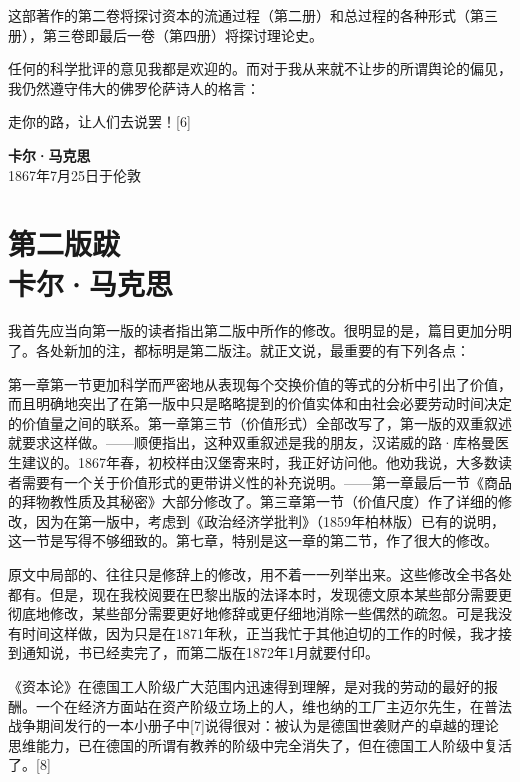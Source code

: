 \documentclass{ctexbook}
\begin{document}
这部著作的第二卷将探讨资本的流通过程（第二册）和总过程的各种形式（第三册），第三卷即最后一卷（第四册）将探讨理论史。

任何的科学批评的意见我都是欢迎的。而对于我从来就不让步的所谓舆论的偏见，我仍然遵守伟大的佛罗伦萨诗人的格言：

走你的路，让人们去说罢！[6]

\begin{flushright}
    \textbf{卡尔·马克思}\\
    \small{1867年7月25日于伦敦}
\end{flushright}



\chapter[卡尔·马克思\hspace{1em}第二版跋]{第二版跋\\{\small 卡尔·马克思}}

我首先应当向第一版的读者指出第二版中所作的修改。很明显的是，篇目更加分明了。各处新加的注，都标明是第二版注。就正文说，最重要的有下列各点：

第一章第一节更加科学而严密地从表现每个交换价值的等式的分析中引出了价值，而且明确地突出了在第一版中只是略略提到的价值实体和由社会必要劳动时间决定的价值量之间的联系。第一章第三节（价值形式）全部改写了，第一版的双重叙述就要求这样做。——顺便指出，这种双重叙述是我的朋友，汉诺威的路·库格曼医生建议的。1867年春，初校样由汉堡寄来时，我正好访问他。他劝我说，大多数读者需要有一个关于价值形式的更带讲义性的补充说明。——第一章最后一节《商品的拜物教性质及其秘密》大部分修改了。第三章第一节（价值尺度）作了详细的修改，因为在第一版中，考虑到《政治经济学批判》（1859年柏林版）已有的说明，这一节是写得不够细致的。第七章，特别是这一章的第二节，作了很大的修改。

原文中局部的、往往只是修辞上的修改，用不着一一列举出来。这些修改全书各处都有。但是，现在我校阅要在巴黎出版的法译本时，发现德文原本某些部分需要更彻底地修改，某些部分需要更好地修辞或更仔细地消除一些偶然的疏忽。可是我没有时间这样做，因为只是在1871年秋，正当我忙于其他迫切的工作的时候，我才接到通知说，书已经卖完了，而第二版在1872年1月就要付印。

《资本论》在德国工人阶级广大范围内迅速得到理解，是对我的劳动的最好的报酬。一个在经济方面站在资产阶级立场上的人，维也纳的工厂主迈尔先生，在普法战争期间发行的一本小册子中[7]说得很对：被认为是德国世袭财产的卓越的理论思维能力，已在德国的所谓有教养的阶级中完全消失了，但在德国工人阶级中复活了。[8]
\end{document}
